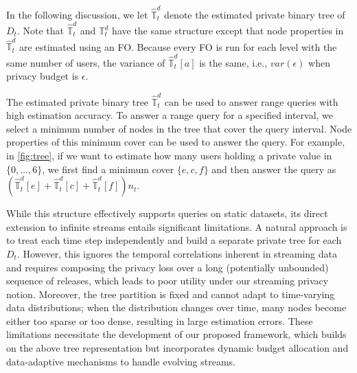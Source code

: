 \documentclass[acmsmall]{acmart}
\newcommand{\Tree}{\mathbb{T}}
\newcommand{\DT}{\Tree^d}
\newcommand{\hDT}{\hat{\Tree}^d}
\newcommand{\var}{\mathit{var}}
\begin{document}
In the following discussion, we let $\hDT_t$ denote the estimated private binary
tree of $D_t$.
Note that $\hDT_t$ and $\DT_t$ have the same structure except that node
properties in $\hDT_t$ are estimated using an FO.
Because every FO is run for each level with the same number of users, the
variance of $\hDT_t[a]$ is the same, i.e., $\var(\epsilon)$ when privacy budget
is $\epsilon$.

The estimated private binary tree $\hDT_t$ can be used to answer range queries
with high estimation accuracy.
To answer a range query for a specified interval, we select a minimum number of
nodes in the tree that cover the query interval.
Node properties of this minimum cover can be used to answer the query.
For example, in \cref{fig:tree}, if we want to estimate how many users holding a
private value in $\{0,\ldots,6\}$, we first find a minimum cover $\{e,c,f\}$ and
then answer the query as $(\hDT_t[e]+\hDT_t[c]+\hDT_t[f])n_t$.

While this structure effectively supports queries on static datasets, its direct extension to infinite streams entails significant limitations. A natural approach is to treat each time step independently and build a separate private tree for each $D_t$. However, this ignores the temporal correlations inherent in streaming data and requires composing the privacy loss over a long (potentially unbounded) sequence of releases, which leads to poor utility under our streaming privacy notion. Moreover, the tree partition is fixed and cannot adapt to time-varying data distributions; when the distribution changes over time, many nodes become either too sparse or too dense, resulting in large estimation errors. These limitations necessitate the development of our proposed framework, which builds on the above tree representation but incorporates dynamic budget allocation and data-adaptive mechanisms to handle evolving streams.

\end{document}
